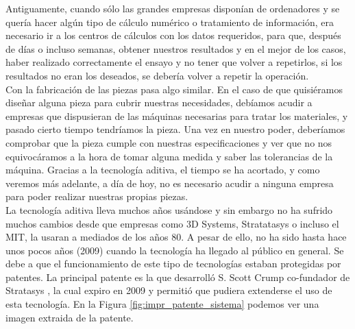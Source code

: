 Antiguamente, cuando sólo las grandes empresas disponían de ordenadores y se quería hacer algún tipo de cálculo numérico o tratamiento de información, era necesario ir a los centros de cálculos con los datos requeridos, para que, después de días o incluso semanas, obtener nuestros resultados y en el mejor de los casos, haber realizado correctamente el ensayo y no tener que volver a repetirlos, si los resultados no eran los deseados, se debería volver a repetir la operación.\\

Con la fabricación de las piezas pasa algo similar. En el caso de que quisiéramos diseñar alguna pieza para cubrir nuestras necesidades, debíamos acudir a empresas que dispusieran de las máquinas necesarias para tratar los materiales, y pasado cierto tiempo tendríamos la pieza. Una vez en nuestro poder, deberíamos comprobar que la pieza cumple con nuestras especificaciones y ver que no nos equivocáramos a la hora de tomar alguna medida y saber las tolerancias de la máquina. Gracias a la tecnología aditiva, el tiempo se ha acortado, y como veremos más adelante, a día de hoy, no es necesario acudir a ninguna empresa para poder realizar nuestras propias piezas.\\

La tecnología aditiva lleva muchos años usándose y sin embargo no ha sufrido muchos cambios desde que empresas como 3D Systems, Stratatasys o incluso el MIT, la usaran a mediados de los años 80. A pesar de ello, no ha sido hasta hace unos pocos años (2009) cuando la tecnología ha llegado al público en general. Se debe a que el funcionamiento de este tipo de tecnologías estaban protegidas por patentes. La principal patente es la que desarrolló S. Scott Crump co-fundador de Stratasys \cite{crump1992apparatus}, la cual expiro en 2009 y permitió que pudiera extenderse el uso de esta tecnología. En la Figura \ref{fig:impr_patente_sistema} podemos ver una imagen extraida de la patente.

